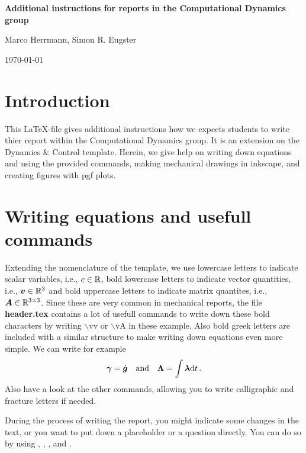 \documentclass[a4paper,10pt,english]{article}
\begin{document}
	
\begin{center}
	\textbf{\large Additional instructions for reports in the Computational Dynamics group}
	
	\qquad
	
	Marco Herrmann, 
	Simon R. Eugster

	\today
	
\end{center}


\section*{Introduction}
%
This \LaTeX-file gives additional instructions how we expects students to write thier report within the Computational Dynamics group. It is an extension on the Dynamics \& Control template. Herein, we give help on writing down equations and using the provided commands, making mechanical drawings in inkscape, and creating figures with pgf plots.
%
\section{Writing equations and usefull commands}
%
Extending the nomenclature of the template, we use lowercase letters to indicate scalar variables, i.e., $c \in \mR$, bold lowercase letters to indicate vector quantities, i.e., $\vv \in \mR^3$ and bold uppercase letters to indicate matrix quantites, i.e., $\vA \in \mR^{3 \times 3}$. Since these are very common in mechanical reports, the file \textbf{header.tex} contains a lot of usefull commands to write down these bold characters by writing $\backslash$vv or $\backslash$vA in these example. Also bold greek letters are included with a similar structure to make writing down equations even more simple. We can write for example 
%
\begin{equation}
	\vga = \dot{\vg}
	\textAND
	\vLa = \int \vla \diff[t]
	\, .
\end{equation}
%
Also have a look at the other commands, allowing you to write calligraphic and fracture letters if needed. 

During the process of writing the report, you might indicate some changes in the text, or you want to put down a placeholder or a question directly. You can do so by using , , ,  and .
\end{document}
